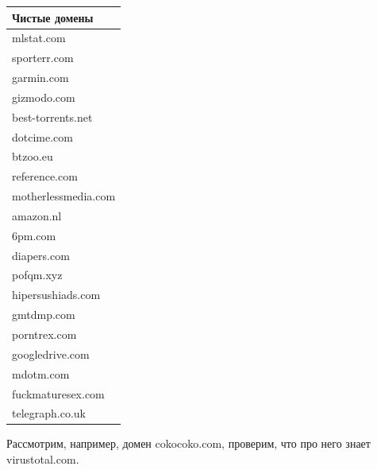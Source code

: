 \documentclass[a4paper,14pt]{extreport} %
\begin{document}
\begin{table}[H]
\begin{tabular}{ |p{8cm}|}
	\end{tabular}
	\begin{tabular}{|p{8cm}|}
		\hline                    
		Чистые домены \\ \hline
		mlstat.com                \\ \hline 
		sporterr.com              \\ \hline 
		garmin.com                \\ \hline 
		gizmodo.com               \\ \hline 
		best-torrents.net         \\ \hline 
		dotcime.com               \\ \hline 
		btzoo.eu                  \\ \hline 
		reference.com             \\ \hline 
		motherlessmedia.com       \\ \hline 
		amazon.nl                 \\ \hline 
		6pm.com                   \\ \hline 
		diapers.com               \\ \hline 
		pofqm.xyz                 \\ \hline 
		hipersushiads.com         \\ \hline 
		gmtdmp.com                \\ \hline 
		porntrex.com              \\ \hline 
		googledrive.com           \\ \hline 
		mdotm.com                 \\ \hline 
		fuckmaturesex.com         \\ \hline 
		telegraph.co.uk           \\ \hline 
	\end{tabular}
\end{table}  
Рассмотрим, например, домен cokocoko.com, проверим, что про него знает virustotal.com.
\end{document}
